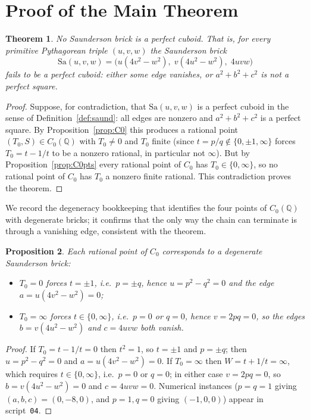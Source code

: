 \documentclass[11pt,reqno]{amsart}
\theoremstyle{plain}
\newtheorem{theorem}{Theorem}[section]
\newtheorem{proposition}[theorem]{Proposition}
\theoremstyle{definition}
\newcommand{\Q}{\mathbb{Q}}
\begin{document}
\section{Proof of the Main Theorem}\label{sec:main}

\begin{theorem}\label{thm:main}
No Saunderson brick is a perfect cuboid. That is, for every primitive
Pythagorean triple $(u,v,w)$ the Saunderson brick
\[
\mathrm{Sa}(u,v,w)=\bigl(u(4v^2-w^2),\;v(4u^2-w^2),\;4uvw\bigr)
\]
fails to be a perfect cuboid: either some edge vanishes, or $a^2+b^2+c^2$ is
not a perfect square.
\end{theorem}

\begin{proof}
Suppose, for contradiction, that $\mathrm{Sa}(u,v,w)$ is a perfect cuboid in
the sense of Definition~\ref{def:saund}: all edges are nonzero and
$a^2+b^2+c^2$ is a perfect square. By Proposition~\ref{prop:C0} this produces a
rational point $(T_0,S)\in C_0(\Q)$ with $T_0\neq0$ and $T_0$ finite (since
$t=p/q\notin\{0,\pm1,\infty\}$ forces $T_0=t-1/t$ to be a nonzero rational, in
particular not $\infty$). But by Proposition~\ref{prop:C0pts} every rational
point of $C_0$ has $T_0\in\{0,\infty\}$, so no rational point of $C_0$ has
$T_0$ a nonzero finite rational. This contradiction proves the theorem.
\end{proof}

We record the degeneracy bookkeeping that identifies the four points of
$C_0(\Q)$ with degenerate bricks; it confirms that the only way the chain can
terminate is through a vanishing edge, consistent with the theorem.

\begin{proposition}\label{prop:deg}
Each rational point of $C_0$ corresponds to a degenerate Saunderson brick:
\begin{itemize}
\item $T_0=0$ forces $t=\pm1$, i.e.\ $p=\pm q$, hence $u=p^2-q^2=0$ and the
edge $a=u(4v^2-w^2)=0$;
\item $T_0=\infty$ forces $t\in\{0,\infty\}$, i.e.\ $p=0$ or $q=0$, hence
$v=2pq=0$, so the edges $b=v(4u^2-w^2)$ and $c=4uvw$ both vanish.
\end{itemize}
\end{proposition}

\begin{proof}
If $T_0=t-1/t=0$ then $t^2=1$, so $t=\pm1$ and $p=\pm q$; then
$u=p^2-q^2=0$ and $a=u(4v^2-w^2)=0$. If $T_0=\infty$ then $W=t+1/t=\infty$,
which requires $t\in\{0,\infty\}$, i.e.\ $p=0$ or $q=0$; in either case
$v=2pq=0$, so $b=v(4u^2-w^2)=0$ and $c=4uvw=0$. Numerical instances
($p=q=1$ giving $(a,b,c)=(0,-8,0)$, and $p=1,q=0$ giving $(-1,0,0)$) appear in
script~\texttt{04}.
\end{proof}
\end{document}
